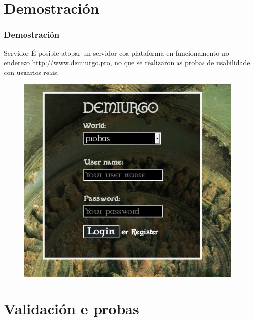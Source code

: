 \documentclass[12pt]{beamer}
\begin{document}
\section{Demostración}
\begin{frame}
\frametitle{Demostración}
\begin{block}{Servidor}
É posible atopar un servidor coa plataforma en funcionamento no enderezo
\url{http://www.demiurgo.pro}, no que se realizaron as probas de usabilidade con
usuarios reais.
\end{block}
\begin{figure}
\includegraphics[scale=0.3]{figuras/presentacion/demiurgo_login.png} 
\end{figure}
\end{frame}



\section{Validación e probas}
\end{document}
